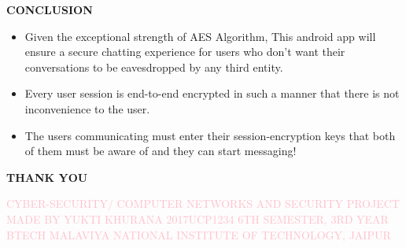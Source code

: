 \documentclass{beamer}
\begin{document}
\begin{frame}
\begin{tcolorbox}
\begin{center}
\textsc{\textbf{\textcolor{byzantium}{CONCLUSION}}}
\end{center}
\end{tcolorbox}
\begin{flushleft}
\begin{itemize}
\item Given the exceptional strength of AES Algorithm, This android app will ensure  a secure chatting experience for users who don’t want their conversations to be eavesdropped by any third entity. 
\item Every user session is end-to-end encrypted in such a manner that there is not inconvenience to the user. 
\item The users communicating must enter their session-encryption keys that both of them must be aware of and they can start messaging!
\end{itemize}
\end{flushleft}
\end{frame}


\begin{frame}
\begin{center}
\begin{tcolorbox}
\begin{center}
\textsc{\textbf{\textcolor{byzantium}{\huge THANK YOU}}}
\end{center}
\end{tcolorbox}
\begin{center}
\textcolor{pink}{
CYBER-SECURITY/ COMPUTER NETWORKS AND SECURITY PROJECT \linebreak
MADE BY YUKTI KHURANA \linebreak
2017UCP1234 \linebreak
6TH SEMESTER, 3RD YEAR BTECH \linebreak
MALAVIYA NATIONAL INSTITUTE OF TECHNOLOGY, JAIPUR \linebreak
}
\end{center}
\end{center}
\end{frame}
\end{document}
